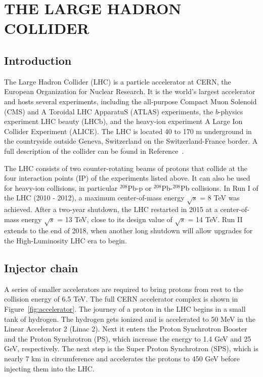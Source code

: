 \chapter{THE LARGE HADRON COLLIDER}
\label{chap:LHC}

\section{Introduction}
\label{sec:LHCintro}
The Large Hadron Collider (LHC) is a particle accelerator at CERN, the European Organization for Nuclear Research. It is the world's largest accelerator and hosts several experiments, including the all-purpose Compact Muon Solenoid (CMS) and A Toroidal LHC ApparatuS (ATLAS) experiments, the $b$-physics experiment LHC beauty (LHCb), and the heavy-ion experiment A Large Ion Collider Experiment (ALICE). The LHC is located 40 to 170 m underground in the countryside outside Geneva, Switzerland on the Switzerland-France border. A full description of the collider can be found in Reference~\cite{LHCMachine}.

The LHC consists of two counter-rotating beams of protons that collide at the four interaction points (IP) of the experiments listed above. It can also be used for heavy-ion collisions, in particular $^{208}$Pb-p or $^{208}$Pb-$^{208}$Pb collisions. In Run I of the LHC (2010 - 2012), a maximum center-of-mass energy $\sqrt{s}$ = 8 TeV was achieved. After a two-year shutdown, the LHC restarted in 2015 at a center-of-mass energy $\sqrt{s}$ = 13 TeV, close to its design value of $\sqrt{s}$ = 14 TeV. Run II extends to the end of 2018, when another long shutdown will allow upgrades for the High-Luminosity LHC era to begin.

\section{Injector chain}
\label{sec:injector}
A series of smaller accelerators are required to bring protons from rest to the collision energy of 6.5 TeV. The full CERN accelerator complex is shown in Figure~\ref{fig:accelerator}. The journey of a proton in the LHC begins in a small tank of hydrogen. The hydrogen gets ionized and is accelerated to 50 MeV in the Linear Accelerator 2 (Linac 2). Next it enters the Proton Synchrotron Booster and the Proton Synchrotron (PS), which increase the energy to 1.4 GeV and 25 GeV, respectively. 
The next step is the Super Proton Synchrotron (SPS), which is nearly 7 km in circumference and accelerates the protons to 450 GeV before injecting them into the LHC. 

